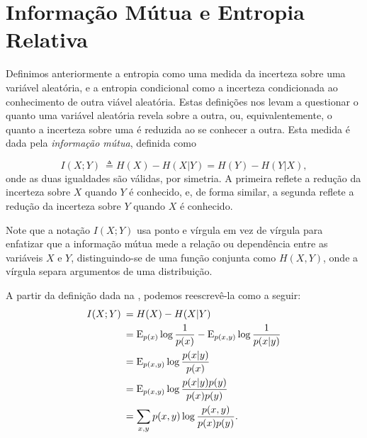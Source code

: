 \section{Informação Mútua e Entropia Relativa}\label{sec:informacaomutua}

Definimos anteriormente a entropia como uma medida da incerteza sobre uma
variável aleatória, e a entropia condicional como a incerteza condicionada ao
conhecimento de outra viável aleatória. Estas definições nos levam a questionar
o quanto uma variável aleatória revela sobre a outra, ou, equivalentemente, o
quanto a incerteza sobre uma é reduzida ao se conhecer a outra. Esta medida é
dada pela \emph{informação mútua}, definida como
\begin{definition}\label{def:infmut}
\begin{equation}\label{eq:informacaomutua-def}
I(X;Y) \: \triangleq H(X) - H(X|Y) = H(Y) - H(Y|X) ,
\end{equation}
onde as duas igualdades são válidas, por simetria.
A primeira reflete a redução da incerteza sobre $X$ quando $Y$ é conhecido,
e, de forma similar, a segunda reflete a redução da incerteza sobre $Y$ quando 
$X$ é conhecido.
\end{definition}

Note que a notação $I(X;Y)$ usa ponto e vírgula em vez de vírgula para enfatizar 
que a informação mútua mede a relação ou dependência entre as variáveis $X$ e
$Y$, distinguindo-se de uma função conjunta como $H(X,Y)$, onde a vírgula separa 
argumentos de uma distribuição.

A partir da definição dada na , podemos reescrevê-la
como a seguir:
\begin{subequations}\label{eq:informacaomutarw}
\begin{align}
 I(X;Y) \: &= H(X) - H(X|Y) \\
	   &= \E_{p(x)} \log \frac{1}{p(x)} - \E_{p(x,y)} \log \frac{1}{p(x|y)} \\
	   &= \E_{p(x,y)} \log \frac{p(x|y)}{p(x)} \\
	   &= \E_{p(x,y)} \log \frac{p(x|y)p(y)}{p(x)p(y)} \\
	   &= \sum_{x,y} p(x,y) \log \frac{p(x,y)}{p(x)p(y)} .\label{eq:infmutdivkl}
\end{align}
\end{subequations}

